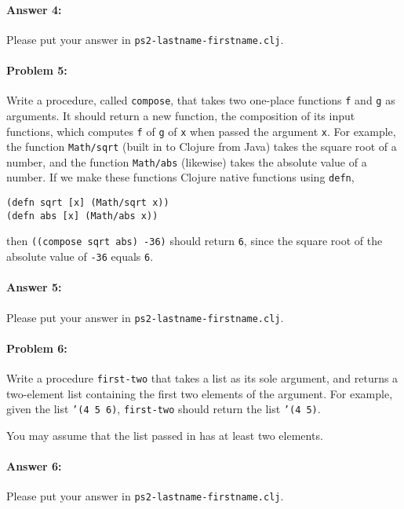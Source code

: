 \documentclass[10pt]{article}
\newcommand{\PSnum}{2}
\begin{document}
\paragraph{Answer 4:} Please put your answer in \texttt{ps\PSnum-lastname-firstname.clj}.

\noindent\hrulefill %

\paragraph{Problem 5:}
Write a procedure, called \texttt{compose}, that takes two one-place
functions \texttt{f} and \texttt{g} as arguments. It should return a
new function, the composition of its input functions, which computes
\texttt{f} of \texttt{g} of \texttt{x} when passed the argument \texttt{x}. For example, the
function \texttt{Math/sqrt} (built in to Clojure from Java) takes the
square root of a number, and the function \texttt{Math/abs} (likewise) 
takes the absolute value of a number. If we make
these functions Clojure native functions using \texttt{defn}, 
\begin{lstlisting}
(defn sqrt [x] (Math/sqrt x))
(defn abs [x] (Math/abs x))
\end{lstlisting}
then
\texttt{((compose sqrt abs) -36)} should return \texttt{6},
since the square root of the absolute value of \texttt{-36} equals
\texttt{6}.

\paragraph{Answer 5:} Please put your answer in \texttt{ps\PSnum-lastname-firstname.clj}.

\noindent\hrulefill %

\paragraph{Problem 6:}
  Write a procedure \texttt{first-two} that takes a list as its sole argument,
  and returns a two-element list containing the first two elements of
  the argument. For example, given the list \texttt{'(4 5 6)},
  \texttt{first-two} should return the list \texttt{'(4 5)}.

  You may assume that the list passed in has at least two elements.

\paragraph{Answer 6:} Please put your answer in \texttt{ps\PSnum-lastname-firstname.clj}.
\end{document}
